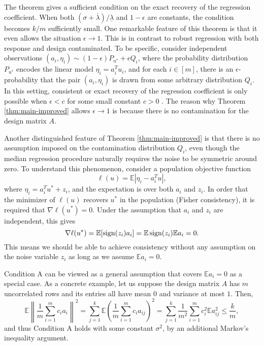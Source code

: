 The theorem gives a sufficient condition on the exact recovery of the regression coefficient. When both $(\sigma+\overline{\lambda})/\underline{\lambda}$ and $1-\epsilon$ are constants, the condition becomes $k/m$ sufficiently small. One remarkable feature of this theorem is that it even allows the situation $\epsilon\rightarrow 1$. This is in contrast to robust regression with both response and design contaminated. To be specific, consider independent observations $(a_i,\eta_i)\sim (1-\epsilon)P_{u^*}+\epsilon Q_i$, where the probability distribution $P_{u^*}$ encodes the linear model $\eta_i=a_i^Tu_i$, and for each $i\in[m]$, there is an $\epsilon$-probability that the pair $(a_i,\eta_i)$ is drawn from some arbitrary distribution $Q_i$. In this setting, consistent or exact recovery of the regression coefficient is only possible when $\epsilon<c$ for some small constant $c>0$ \citep{gao2020}. The reason why Theorem \ref{thm:main-improved} allows $\epsilon\rightarrow 1$ is because there is no contamination for the design matrix $A$.

Another distinguished feature of Theorem \ref{thm:main-improved} is that there is no assumption imposed on the contamination distribution $Q_i$, even though the median regression procedure naturally requires the noise to be symmetric around zero. To understand this phenomenon, consider a population objective function
$$\ell(u)=\mathbb{E}|\eta_i-a_i^Tu|,$$
where $\eta_i=a_i^Tu^*+z_i$, and the expectation is over both $a_i$ and $z_i$. In order that the minimizer of $\ell(u)$ recovers $u^*$ in the population (Fisher consistency), it is required that $\nabla\ell(u^*)=0$. Under the assumption that $a_i$ and $z_i$ are independent, this gives
\begin{equation}
\nabla\ell(u^*)=\mathbb{E}[\sgn(z_i)a_i]=\mathbb{E}\sgn(z_i)\mathbb{E}a_i=0. \label{eq:pop-insight}
\end{equation}
This means we should be able to achieve consistency without any assumption on the noise variable $z_i$ as long as we assume $\mathbb{E}a_i=0$.

Condition A can be viewed as a general assumption that covers $\mathbb{E}a_i=0$ as a special case. As a concrete example, let us suppose the design matrix $A$ has $m$ uncorrelated rows and its entries all have mean $0$ and variance at most $1$. Then,
$$\mathbb{E}\left\|\frac{1}{m}\sum_{i=1}^mc_ia_i\right\|^2=\sum_{j=1}^k\mathbb{E}\left(\frac{1}{m}\sum_{i=1}^mc_ia_{ij}\right)^2=\sum_{j=1}^k\frac{1}{m^2}\sum_{i=1}^mc_i^2\mathbb{E}a_{ij}^2\leq \frac{k}{m},$$
and thus Condition A holds with some constant $\sigma^2$, by an additional Markov's inequality argument.

